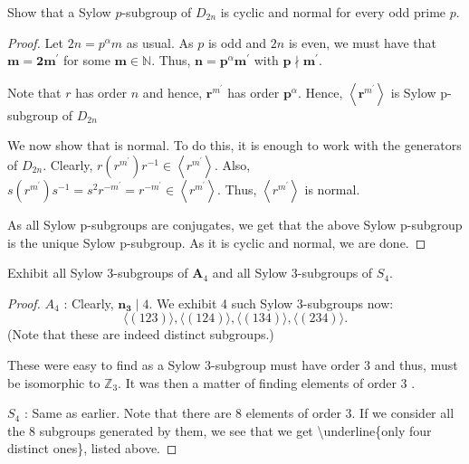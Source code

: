 \begin{exercise}
Show that a Sylow $p$-subgroup of $D_{2 n}$ is cyclic and normal for every odd prime $p$.
\end{exercise}
\begin{proof}
Let $2 n=p^\alpha m$ as usual. As $p$ is odd and $2 n$ is even, we must have that $\boldsymbol{m}=\mathbf{2} \boldsymbol{m}^{\prime}$ for some $\boldsymbol{m} \in \mathbb{N}$. Thus, $\boldsymbol{n}=\boldsymbol{p}^\alpha \boldsymbol{m}^{\prime}$ with $\boldsymbol{p} \nmid  \boldsymbol{m}^{\prime}$.

Note that $r$ has order $n$ and hence, $\boldsymbol{r}^{m^{\prime}}$ has order $\boldsymbol{p}^\alpha$. Hence, $\left\langle\boldsymbol{r}^{m^{\prime}}\right\rangle$ is Sylow p-subgroup of $D_{2 n}$

We now show that is normal. To do this, it is enough to work with the generators of $D_{2 n}$. Clearly, $r\left(r^{m^{\prime}}\right) r^{-1} \in\left\langle r^{m^{\prime}}\right\rangle$. Also, $s\left(r^{m^{\prime}}\right) s^{-1}=s^2 r^{-m^{\prime}}=r^{-m^{\prime}} \in\left\langle r^{m^{\prime}}\right\rangle$. Thus, $\left\langle r^{m^{\prime}}\right\rangle$ is normal.

As all Sylow p-subgroups are conjugates, we get that the above Sylow p-subgroup is the unique Sylow p-subgroup. As it is cyclic and normal, we are done.
\end{proof}

\begin{exercise}
Exhibit all Sylow 3-subgroups of $\boldsymbol{A}_4$ and all Sylow 3-subgroups of $S_4$.
\end{exercise}
\begin{proof}
$A_4$ : Clearly, $\boldsymbol{n}_{\mathbf{3}} \mid 4$. We exhibit 4 such Sylow 3-subgroups now:
\[
\langle(123)\rangle,\langle(124)\rangle,\langle(134)\rangle,\langle(234)\rangle .
\]
(Note that these are indeed distinct subgroups.)

These were easy to find as a Sylow 3-subgroup must have order 3 and thus, must be isomorphic to $\mathbb{Z}_3$. It was then a matter of finding elements of order 3 .

$S_4$ : Same as earlier. Note that there are 8 elements of order 3. If we consider all the 8 subgroups generated by them, we see that we get \textbackslash{}underline\{only four distinct ones\}, listed above.
\end{proof}

